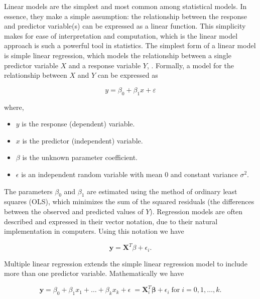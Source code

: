 \documentclass[12pt, twoside,hidelinks]{article}
\theoremstyle{definition}
\numberwithin{equation}{section}
\begin{document}
Linear models are the simplest and most common among statistical models. In essence, they make a simple assumption: the relationship between the response and predictor variable(s) can be expressed as a linear function. This simplicity makes for ease of interpretation and computation, which is the linear model approach is such a powerful tool in statistics.
\newline
The simplest form of a linear model is simple linear regression, which models the relationship between a single predictor variable \(X\) and a response variable \(Y\), \citet[p.~2]{wood2017}. Formally, a model for the relationship between \(X\) and \(Y\) can be expressed as

\begin{equation}
    y = \beta_0 + \beta_1 x + \varepsilon
\end{equation}

where,

\begin{itemize}
    \item \(y\) is the response (dependent) variable.
    \item \(x\) is the predictor (independent) variable.
    \item \(\beta\) is the unknown parameter coefficient.
    \item \(\epsilon\) is an independent random variable with mean 0 and constant variance \(\sigma^2\).
\end{itemize}

The parameters \(\beta_0\) and \(\beta_1\) are estimated using the method of ordinary least squares (OLS), which minimizes the sum of the squared residuals (the differences between the observed and predicted values of \(Y\)).
\newline
Regression models are often described and expressed in their vector notation, due to their natural implementation in computers. Using this notation we have 

\begin{equation}
    \boldsymbol{y} = \mathbf{X}^T\beta+ \epsilon_i.
    \label{eq:vec_notation}
\end{equation}

Multiple linear regression extends the simple linear regression model to include more than one predictor variable. Mathematically we have

\begin{equation}
    \boldsymbol{y} = \beta_0 + \beta_1 x_1 + \ldots + \beta_k x_k + \epsilon \;  = \mathbf{X}^{T}_{i}\boldsymbol{\beta} + \epsilon_i \;  \text{for} \; i = 0, 1, \dots, k.
    \label{eq:mlm_general_form}
\end{equation}
\end{document}
